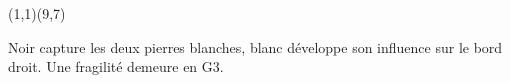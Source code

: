 \documentclass[preview, border=0pt, varwidth=false]{standalone}
\begin{document}
	\setgounit{0.6cm} 
	
	\parbox[c][14.65cm][c]{10.2cm}{
		\centering
		
		\begin{psgopartialboard}{(1,1)(9,7)}
			\pass
		\end{psgopartialboard}
		
		\vspace{1em}
		Noir capture les deux pierres blanches, blanc développe son influence sur le bord droit. Une fragilité demeure en G3.
	}
	
\end{document}
